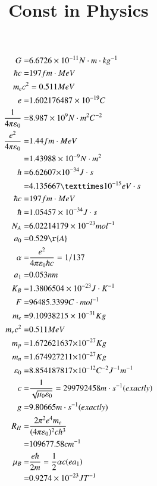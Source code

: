 \documentclass[UTF8,9pt]{ctexart}
\title{Const in Physics}
\begin{document}
    \maketitle
 
    \begin{align*}
        G=&6.6726\times{10}^{-11}N \cdot m \cdot kg^{-1}\\
        \hbar c=&197fm \cdot MeV\\ 
        m_ec^2&=0.511MeV\\
        e=&1.602176487\times{10}^{-19}C\\ 
        \dfrac{1}{4\pi\varepsilon_0}=&8.987\times{10}^9N \cdot m^{2}C^{-2}\\
        \frac{e^2}{4\pi\epsilon_0}  = & 1.44   fm\cdot MeV \\
        =&1.43988 \times 10^{-9} N\cdot m^2\\
        h=&6.62607{\times10}^{-34}J \cdot s\\
        =&4.135667×10^{-15}eV \cdot s\\
        \hbar c                     = & 197    fm\cdot MeV \\
        \hbar=&1.05457 \times 10^{-34} J \cdot s\\
        N_A=&6.02214179\times{10}^{-23}{mol}^{-1}\\
        a_0=&0.529 \r{A}\\
        \alpha=&\dfrac{e^2}{4\pi\epsilon_0\hbar c}=1/137\\
		a_1                         = & 0.053  nm\\ 
        K_B=&1.3806504\times{10}^{-23}J \cdot K^{-1}\\
        F=&96485.3399C \cdot mol^{-1}\\  
        m_e=&9.10938215\times{10}^{-31}Kg\\
		m_ec^2                      = & 0.511  MeV         \\
        m_p=&1.672621637{\times10}^{-27}Kg\\
        m_n=&1.674927211{\times10}^{-27}Kg\\
        \varepsilon_0=&8.854187817{\times10}^{-12}C^{-2}J^{-1}m^{-1}\\
        c=&\dfrac{1}{\sqrt{\mu_0\varepsilon_0}}=299792458m \cdot s^{-1}(exactly)\\
        g=&9.80665m \cdot s^{-1}(exactly)\\
        R_H=&\f{2\pi^2e^4m_e}{(4\pi\epsilon_0)^2ch^3}\\
         =&109677.58 cm^{-1}\\
        \mu_B=&\dfrac{e\hbar}{2m}=\dfrac{1}{2}\alpha c(ea_1)\\
        =& 0.9274\e{-23} JT^{-1}\\
    \end{align*}
    
\end{document}
